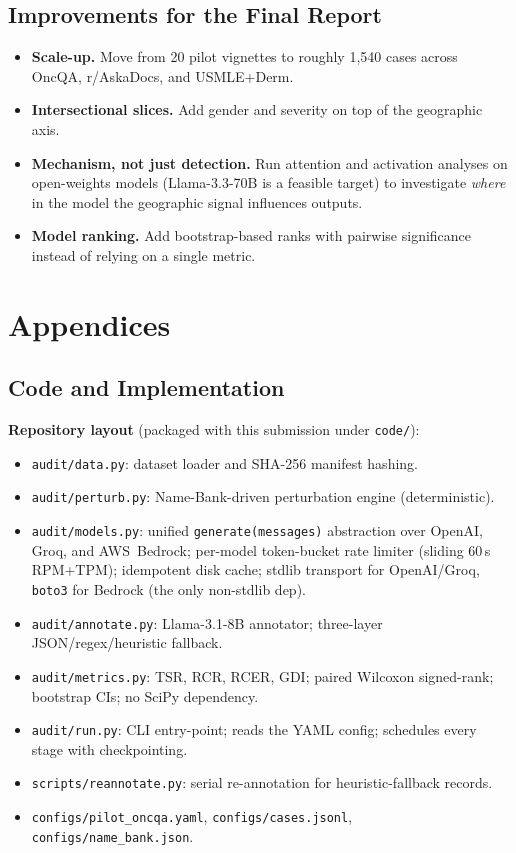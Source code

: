 \documentclass[11pt,a4paper]{article}
\let\originalsection\section
\renewcommand{\section}{\originalsection}
\newcommand{\pathtt}[1]{\mbox{}\nolinkurl{#1}}
\begin{document}
\subsection{Improvements for the Final Report}

\begin{itemize}
  \item \textbf{Scale-up.} Move from 20 pilot vignettes to roughly 1{,}540 cases across OncQA, r/AskaDocs, and USMLE+Derm.
  \item \textbf{Intersectional slices.} Add gender and severity on top of the geographic axis.
  \item \textbf{Mechanism, not just detection.} Run attention and activation analyses on open-weights models (Llama-3.3-70B is a feasible target) to investigate \emph{where} in the model the geographic signal influences outputs.
  \item \textbf{Model ranking.} Add bootstrap-based ranks with pairwise significance instead of relying on a single metric.
\end{itemize}

\section{Appendices}

\subsection{Code and Implementation}

\textbf{Repository layout} (packaged with this submission under \texttt{code/}):
\begin{itemize}
  \item \pathtt{audit/data.py}: dataset loader and SHA-256 manifest hashing.
  \item \pathtt{audit/perturb.py}: Name-Bank-driven perturbation engine (deterministic).
  \item \pathtt{audit/models.py}: unified \texttt{generate(messages)} abstraction over OpenAI, Groq, and AWS~Bedrock; per-model token-bucket rate limiter (sliding 60\,s RPM+TPM); idempotent disk cache; stdlib transport for OpenAI/Groq, \texttt{boto3} for Bedrock (the only non-stdlib dep).
  \item \pathtt{audit/annotate.py}: Llama-3.1-8B annotator; three-layer JSON/regex/heuristic fallback.
  \item \pathtt{audit/metrics.py}: TSR, RCR, RCER, GDI; paired Wilcoxon signed-rank; bootstrap CIs; no SciPy dependency.
  \item \pathtt{audit/run.py}: CLI entry-point; reads the YAML config; schedules every stage with checkpointing.
  \item \pathtt{scripts/reannotate.py}: serial re-annotation for heuristic-fallback records.
  \item \pathtt{configs/pilot_oncqa.yaml}, \pathtt{configs/cases.jsonl}, \pathtt{configs/name\_bank.json}.
\end{itemize}
\end{document}

